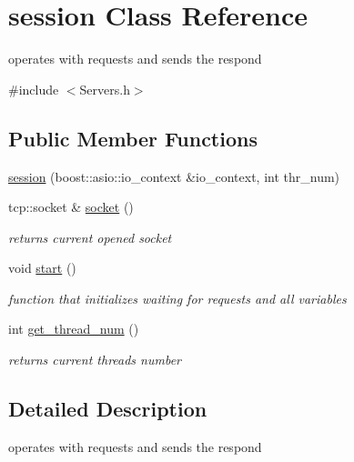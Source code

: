 \hypertarget{classsession}{}\section{session Class Reference}
\label{classsession}


operates with requests and sends the respond  




{\ttfamily \#include $<$Servers.\+h$>$}

\subsection*{Public Member Functions}
\begin{DoxyCompactItemize}
\item 
\hyperlink{classsession_aba171d4b6627a93b189c4accbefac6ba}{session} (boost\+::asio\+::io\+\_\+context \&io\+\_\+context, int thr\+\_\+num)
\item 
\mbox{\label{classsession_a877765bc7124ada6580ad2f748b4d72c}} 
tcp\+::socket \& \hyperlink{classsession_a877765bc7124ada6580ad2f748b4d72c}{socket} ()
\begin{DoxyCompactList}\small\item\em returns current opened socket \end{DoxyCompactList}\item 
\mbox{\label{classsession_ad69144e27f558b8960efae132f2e15f4}} 
void \hyperlink{classsession_ad69144e27f558b8960efae132f2e15f4}{start} ()
\begin{DoxyCompactList}\small\item\em function that initializes waiting for requests and all variables \end{DoxyCompactList}\item 
\mbox{\label{classsession_a79eb1764d3a89cd90b04966918d7dd6c}} 
int \hyperlink{classsession_a79eb1764d3a89cd90b04966918d7dd6c}{get\+\_\+thread\+\_\+num} ()
\begin{DoxyCompactList}\small\item\em returns current thread\textquotesingle{}s number \end{DoxyCompactList}\end{DoxyCompactItemize}


\subsection{Detailed Description}
operates with requests and sends the respond 

